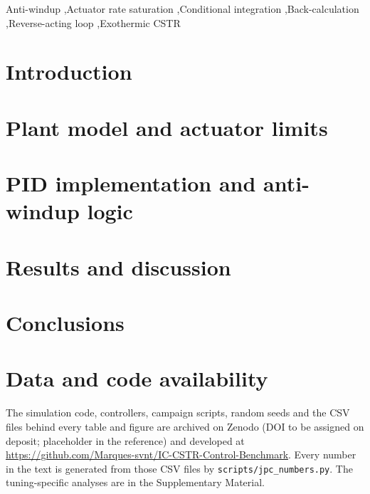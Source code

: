 \documentclass[a4paper,fleqn]{cas-dc}
\begin{document}


\begin{keywords}
Anti-windup \sep Actuator rate saturation \sep Conditional integration \sep Back-calculation \sep Reverse-acting loop \sep Exothermic CSTR
\end{keywords}

\maketitle

\section{Introduction}\label{sec:intro}


\section{Plant model and actuator limits}\label{sec:model}


\section{PID implementation and anti-windup logic}\label{sec:pid}


\section{Results and discussion}\label{sec:results}


\section{Conclusions}\label{sec:conclusion}


\section*{Data and code availability}
The simulation code, controllers, campaign scripts, random seeds and the CSV files behind every table and figure are archived on Zenodo \cite{andrade2026software} (DOI to be assigned on deposit; placeholder in the reference) and developed at \url{https://github.com/Marques-svnt/IC-CSTR-Control-Benchmark}. Every number in the text is generated from those CSV files by \texttt{scripts/jpc\_numbers.py}. The tuning-specific analyses are in the Supplementary Material.
\end{document}
